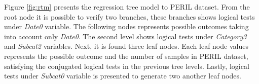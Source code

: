 Figure \ref{fig:rtm} presents the regression tree model to PERIL dataset. From the root node it is possible to verify two branches, these branches shows logical tests under \textit{Date0} variable. The following nodes represents possible outcomes taking into account only \textit{Date0}. The second level shows logical tests under \textit{Category3} and \textit{Subcat2} variables. Next, it is found three leaf nodes. Each leaf node values represents the possible outcome and the number of samples in PERIL dataset, satisfying the conjugated logical tests in the previous tree levels. Lastly, logical tests under \textit{Subcat0} variable is presented to generate two another leaf nodes.

